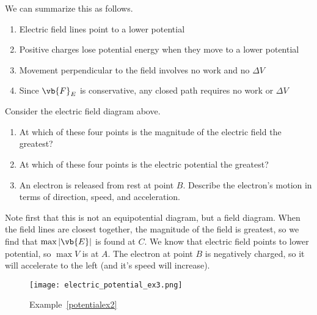 \documentclass[11pt]{article}
\begin{document}
We can summarize this as follows.
\begin{enumerate}\setlength\itemsep{0pt}
    \item Electric field lines point to a lower potential
    \item Positive charges lose potential energy when they move to a lower potential
    \item Movement perpendicular to the field involves no work and no $\Delta V$
    \item Since $\vb{F}_E$ is conservative, any closed path requires no work or $\Delta V$
\end{enumerate}
\begin{example}\label{potentialex2}
    Consider the electric field diagram above.
    \begin{enumerate}\setlength\itemsep{0em}
        \item At which of these four points is the magnitude of the electric field the greatest?
        \item At which of these four points is the electric potential the greatest?
        \item An electron is released from rest at point $B$. Describe the electron's motion in terms of direction, speed, and acceleration.
    \end{enumerate}
\end{example}
\begin{solution}
    Note first that this is not an equipotential diagram, but a field diagram. When the field lines are closest together, the magnitude of the field is greatest, so we find that $\max |\vb{E}|$ is found at $\boxed{C}$. We know that electric field points to lower potential, so $\max V$ is at $\boxed{A}$. The electron at point $B$ is negatively charged, so it will accelerate to the left (and it's speed will increase).
\end{solution}
\begin{figure}
    \centering
    \texttt{[image: electric\_potential\_ex3.png]}
    \caption{Example~\ref{potentialex2}}
\end{figure}
\end{document}
